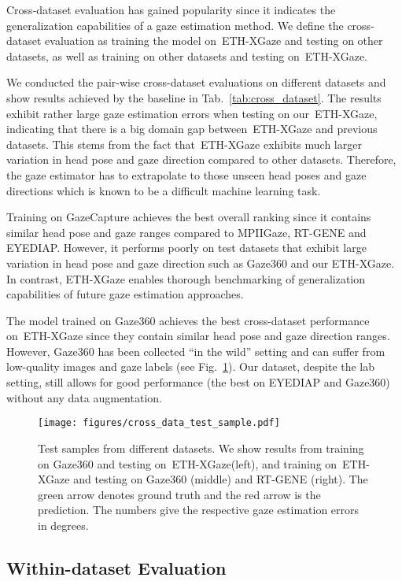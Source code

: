 \documentclass[runningheads]{llncs}
\newcommand{\datasetname}{ETH-XGaze\xspace}
\begin{document}
Cross-dataset evaluation has gained popularity since it indicates the generalization capabilities of a gaze estimation method.
We define the cross-dataset evaluation as training the model on~\datasetname and testing on other datasets, as well as training on other datasets and testing on~\datasetname.

We conducted the pair-wise cross-dataset evaluations on different datasets and show results achieved by the baseline in Tab.~\ref{tab:cross_dataset}.
The results exhibit rather large gaze estimation errors when testing on our~\datasetname, indicating that there is a big domain gap between~\datasetname and previous datasets.
This stems from the fact that~\datasetname exhibits much larger variation in head pose and gaze direction compared to other datasets.
Therefore, the gaze estimator has to extrapolate to those unseen head poses and gaze directions which is known to be a difficult machine learning task.

Training on GazeCapture achieves the best overall ranking since it contains similar head pose and gaze ranges compared to MPIIGaze, RT-GENE and EYEDIAP.
However, it performs poorly on test datasets that exhibit large variation in head pose and gaze direction such as Gaze360 and our \datasetname.
In contrast, \datasetname enables thorough benchmarking of generalization capabilities of future gaze estimation approaches.

The model trained on Gaze360 achieves the best cross-dataset performance on~\datasetname since they contain similar head pose and gaze direction ranges.
However, Gaze360 has been collected ``in the wild'' setting and can suffer from low-quality images and gaze labels (see Fig.~\ref{fig:test_sample}). 
Our dataset, despite the lab setting, still allows for good performance (the best on EYEDIAP and Gaze360) without any data augmentation.


\begin{figure}[t]
    \centering
    \texttt{[image: figures/cross\_data\_test\_sample.pdf]}
    \caption{Test samples from different datasets. We show results from training on Gaze360 and testing on~\datasetname (left), and training on~\datasetname and testing on Gaze360 (middle) and RT-GENE (right). The green arrow denotes ground truth and the red arrow is the prediction. The numbers give the respective gaze estimation errors in degrees.}
    \label{fig:test_sample}
\end{figure}

\subsection{Within-dataset Evaluation}
\label{sec:eval_within_dataset}
\end{document}
